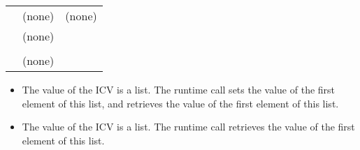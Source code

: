 {\begin{supertabular}{ p{1.2in} p{2.0in} p{1.5in}}
 & (none) & (none)\\

 & (none) & \\

 &  & \\

 & (none) & \\

\end{supertabular}
\linenumbers} %

\comments
\begin{itemize}
\item The value of the  ICV is a list. The runtime call 
 sets the value of the first element of this list, and 
 retrieves the value of the first element of this list.

\item The value of the  ICV is a list. The runtime call  
retrieves the value of the first element of this list. 
\end{itemize}


